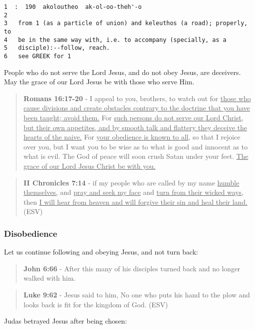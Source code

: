 \documentclass[11pt]{article}
\begin{document}
\begin{verbatim}
1  :  190  akoloutheo  ak-ol-oo-theh'-o
2  
3   from 1 (as a particle of union) and keleuthos (a road); properly, to
4   be in the same way with, i.e. to accompany (specially, as a
5   disciple):--follow, reach.
6   see GREEK for 1
\end{verbatim}

People who do not serve the Lord Jesus, and do not obey Jesus, are deceivers. May the grace of our Lord Jesus be with those who serve Him.

\begin{quote}
\textbf{Romans 16:17-20} - I appeal to you, brothers, to watch out for \uline{those who cause divisions and create obstacles contrary to the doctrine that you have been taught; avoid them.} For \uline{such persons do not serve our Lord Christ, but their own appetites, and by smooth talk and flattery they deceive the hearts of the naive.} For \uline{your obedience is known to all}, so that I rejoice over you, but I want you to be wise as to what is good and innocent as to what is evil. The God of peace will soon crush Satan under your feet. \uline{The grace of our Lord Jesus Christ be with you.}
\end{quote}

\begin{quote}
\textbf{II Chronicles 7:14} - if my people who are called by my name \uline{humble themselves,} and \uline{pray and seek my face} and \uline{turn from their wicked ways,} then \uline{I will hear from heaven and will forgive their sin and heal their land.} (ESV)
\end{quote}

\subsubsection{Disobedience}
\label{sec:org677133e}
Let us continue following and obeying Jesus, and not turn back:

\begin{quote}
\textbf{John 6:66} - After this many of his disciples turned back and no longer walked with him.
\end{quote}

\begin{quote}
\textbf{Luke 9:62} - Jesus said to him, No one who puts his hand to the plow and looks back is fit for the kingdom of God. (ESV)
\end{quote}

Judas betrayed Jesus after being chosen:
\end{document}
